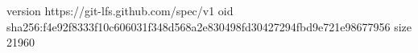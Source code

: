 version https://git-lfs.github.com/spec/v1
oid sha256:f4e92f8333f10c606031f348d568a2e830498fd30427294fbd9e721e98677956
size 21960
